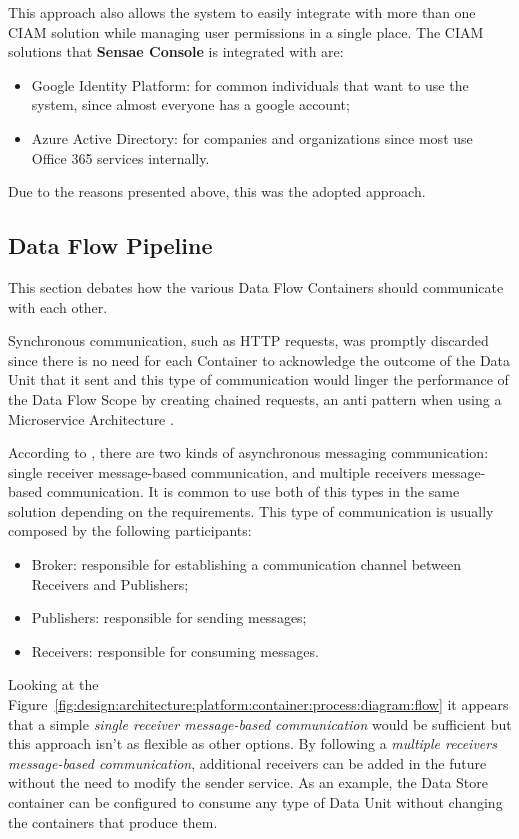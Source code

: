 This approach also allows the system to easily integrate with more than one \gls{CIAM} solution while managing user permissions in a single place. The \gls{CIAM} solutions that \textbf{Sensae Console} is integrated with are:

\begin{itemize}
   \item Google Identity Platform: for common individuals that want to use the system, since almost everyone has a google account;
   \item Azure Active Directory: for companies and organizations since most use Office 365 services internally.
\end{itemize}

Due to the reasons presented above, this was the adopted approach.

\subsection{Data Flow Pipeline}
\label{subsec:design:alternatives:flow}

This section debates how the various Data Flow Containers should communicate with each other.

Synchronous communication, such as HTTP requests, was promptly discarded since there is no need for each Container to acknowledge the outcome of the Data Unit that it sent and this type of communication would linger the performance of the Data Flow Scope by creating chained requests, an anti pattern when using a Microservice Architecture \parencite{microsoftmicroanti}.

According to \cite{microsoftasync}, there are two kinds of asynchronous messaging communication: single receiver message-based communication, and multiple receivers message-based communication. It is common to use both of this types in the same solution depending on the requirements. This type of communication is usually composed by the following participants:

\begin{itemize}
   \item Broker: responsible for establishing a communication channel between Receivers and Publishers;
   \item Publishers: responsible for sending messages;
   \item Receivers: responsible for consuming messages.
\end{itemize}

Looking at the Figure~\ref{fig:design:architecture:platform:container:process:diagram:flow} it appears that a simple \textit{single receiver message-based communication} would be sufficient but this approach isn't as flexible as other options. By following a \textit{multiple receivers message-based communication}, additional receivers can be added in the future without the need to modify the sender service. As an example, the Data Store container can be configured to consume any type of Data Unit without changing the containers that produce them.


